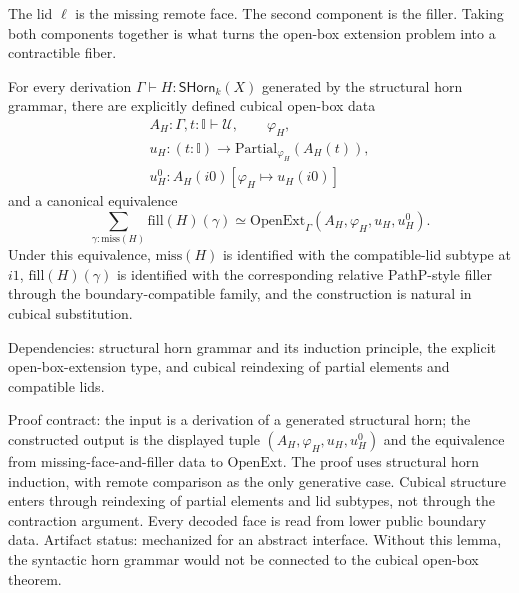 \documentclass{lmcs}
\newcommand{\OpenExt}{\mathrm{OpenExt}}
\begin{document}
The lid \(\ell\) is the missing remote face.  The second component is the filler.  Taking
both components together is what turns the open-box extension problem into a contractible
fiber.

\begin{lem}
\label{lem:horn-open-box}
For every derivation \(\Gamma\vdash H:\mathsf{SHorn}_k(X)\) generated by the structural horn
grammar, there are explicitly defined cubical open-box data
\[
  \begin{gathered}
  A_H:\Gamma,t:\mathbb I\vdash\mathcal U,\qquad \varphi_H,\\
  u_H:(t:\mathbb I)\to\mathrm{Partial}_{\varphi_H}(A_H(t)),\\
  u^0_H:A_H(i0)[\varphi_H\mapsto u_H(i0)]
  \end{gathered}
\]
and a canonical equivalence
\[
  \sum_{\gamma:\mathrm{miss}(H)}\mathrm{fill}(H)(\gamma)
  \simeq
  \mathrm{OpenExt}_{\Gamma}(A_H,\varphi_H,u_H,u^0_H).
\]
Under this equivalence, \(\mathrm{miss}(H)\) is identified with the compatible-lid subtype at
\(i1\), \(\mathrm{fill}(H)(\gamma)\) is identified with the corresponding relative
\(\mathrm{PathP}\)-style filler through the boundary-compatible family, and the construction
is natural in cubical substitution.

Dependencies: structural horn grammar and its induction principle, the explicit
open-box-extension type, and cubical reindexing of partial elements and compatible lids.

Proof contract: the input is a derivation of a generated structural horn; the
constructed output is the displayed tuple
\((A_H,\varphi_H,u_H,u^0_H)\) and the equivalence from
missing-face-and-filler data to \(\OpenExt\).  The proof uses structural horn
induction, with remote comparison as the only generative case.  Cubical
structure enters through reindexing of partial elements and lid subtypes, not
through the contraction argument.  Every decoded face is read from lower public
boundary data.  Artifact status: mechanized for an abstract interface.  Without
this lemma, the syntactic horn grammar would not be connected to the cubical
open-box theorem.
\end{lem}
\end{document}
